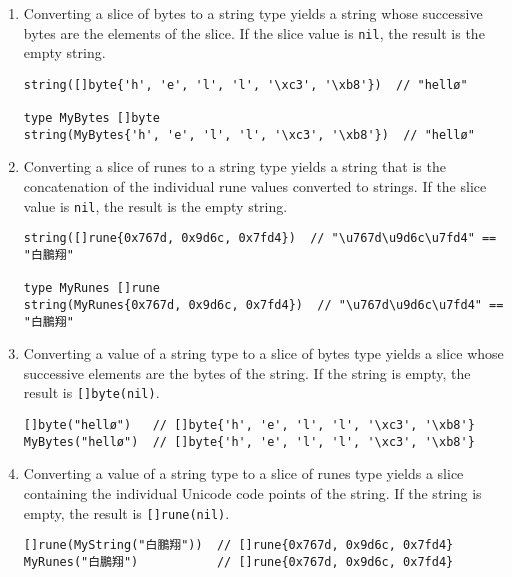 {\begin{enumerate}
\begin{Verbatim}[frame=single]
string('a')       // "a"
string(-1)        // "\ufffd" == "\xef\xbf\xbd"
string(0xf8)      // "\u00f8" == "ø" == "\xc3\xb8"
type MyString string
MyString(0x65e5)  // "\u65e5" == "日" == "\xe6\x97\xa5"
\end{Verbatim}
\item
  Converting a slice of bytes to a string type yields a string whose
  successive bytes are the elements of the slice. If the slice value is
  \texttt{nil}, the result is the empty string.

\begin{Verbatim}[frame=single]
string([]byte{'h', 'e', 'l', 'l', '\xc3', '\xb8'})  // "hellø"

type MyBytes []byte
string(MyBytes{'h', 'e', 'l', 'l', '\xc3', '\xb8'})  // "hellø"
\end{Verbatim}
\item
  Converting a slice of runes to a string type yields a string that is
  the concatenation of the individual rune values converted to strings.
  If the slice value is \texttt{nil}, the result is the empty string.

\begin{Verbatim}[frame=single]
string([]rune{0x767d, 0x9d6c, 0x7fd4})  // "\u767d\u9d6c\u7fd4" == "白鵬翔"

type MyRunes []rune
string(MyRunes{0x767d, 0x9d6c, 0x7fd4})  // "\u767d\u9d6c\u7fd4" == "白鵬翔"
\end{Verbatim}
\item
  Converting a value of a string type to a slice of bytes type yields a
  slice whose successive elements are the bytes of the string. If the
  string is empty, the result is \texttt{{[}{]}byte(nil)}.

\begin{Verbatim}[frame=single]
[]byte("hellø")   // []byte{'h', 'e', 'l', 'l', '\xc3', '\xb8'}
MyBytes("hellø")  // []byte{'h', 'e', 'l', 'l', '\xc3', '\xb8'}
\end{Verbatim}
\item
  Converting a value of a string type to a slice of runes type yields a
  slice containing the individual Unicode code points of the string. If
  the string is empty, the result is \texttt{{[}{]}rune(nil)}.

\begin{Verbatim}[frame=single]
[]rune(MyString("白鵬翔"))  // []rune{0x767d, 0x9d6c, 0x7fd4}
MyRunes("白鵬翔")           // []rune{0x767d, 0x9d6c, 0x7fd4}
\end{Verbatim}
\end{enumerate}

}

